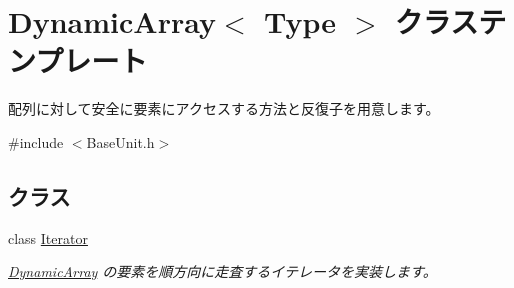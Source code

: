 \hypertarget{class_dynamic_array}{}\section{Dynamic\+Array$<$ Type $>$ クラステンプレート}
\label{class_dynamic_array}


配列に対して安全に要素にアクセスする方法と反復子を用意します。 




{\ttfamily \#include $<$Base\+Unit.\+h$>$}

\subsection*{クラス}
\begin{DoxyCompactItemize}
\item 
class \hyperlink{class_dynamic_array_1_1_iterator}{Iterator}
\begin{DoxyCompactList}\small\item\em \hyperlink{class_dynamic_array}{Dynamic\+Array} の要素を順方向に走査するイテレータを実装します。\end{DoxyCompactList}\end{DoxyCompactItemize}
